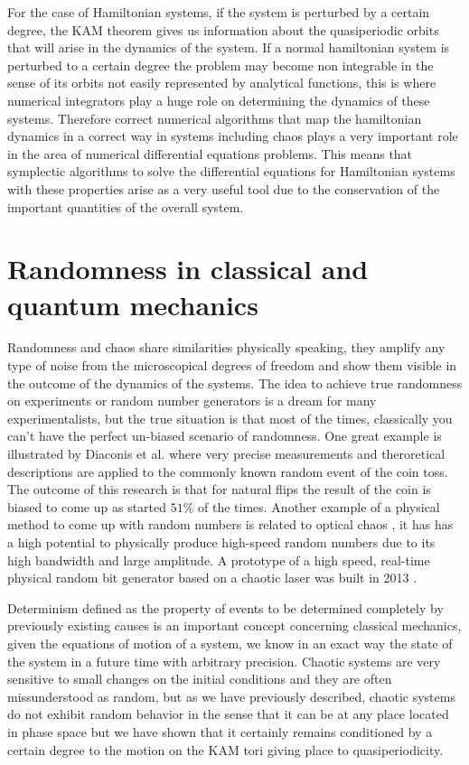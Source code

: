 For the case of Hamiltonian systems, if the system is perturbed by a certain degree, the KAM theorem gives us information about the quasiperiodic orbits that will arise in the dynamics of the system\cite{arnold2009proof}\cite{kolmogorov1954conservation}\cite{tabor1989chaos}. If a normal hamiltonian system is perturbed to a certain degree the problem may become non integrable in the sense of its orbits not easily represented by analytical functions, this is where numerical integrators play a huge role on determining the dynamics of these systems. Therefore correct numerical algorithms that map the hamiltonian dynamics in a correct way in systems including chaos plays a very important role in the area of numerical differential equations problems. This means that symplectic algorithms to solve the differential equations for Hamiltonian systems with these properties arise as a very useful tool due to the conservation of the important quantities of the overall system.



\section{Randomness in classical and quantum mechanics}

Randomness and chaos share similarities physically speaking, they amplify any type of noise from the microscopical degrees of freedom and show them visible in the outcome of the dynamics of the systems. The idea to achieve true randomness on experiments or random number generators is a dream for many experimentalists, but the true situation is that most of the times, classically you can't have the perfect un-biased scenario of randomness. One great example is illustrated by Diaconis et al. \cite{diaconis2007dynamical} where very precise measurements and theroretical descriptions are applied to the commonly known random event of the coin toss. The outcome of this research is that for natural flips the result of the coin is biased to come up as started $51\%$ of the times. Another example of a physical method to come up with random numbers is related to optical chaos \cite{li2010all}\cite{li2016fully}, it has  has a high potential to physically produce high-speed random numbers due to its high bandwidth and large amplitude. A prototype of a high speed, real-time physical random bit generator based on a chaotic laser was built in 2013 \cite{wang20134}.\par


Determinism defined as the property of events to be determined completely by previously existing causes is an important concept concerning classical mechanics, given the equations of motion of a system, we know in an exact way the state of the system in a future time with arbitrary precision. Chaotic systems are very sensitive to small changes on the initial conditions and they are often missunderstood as random, but as we have previously described, chaotic systems do not exhibit random behavior in the sense that it can be at any place located in phase space but we have shown that it certainly remains conditioned by a certain degree to the motion on the KAM tori giving place to quasiperiodicity.\par 

